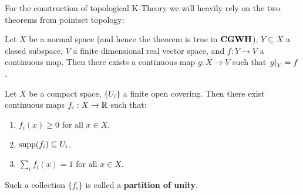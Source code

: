 For the construction of topological K-Theory we will heavily rely on the two theorems from pointset topology:
\begin{theorem} Let $X$ be a normal space (and hence the theorem is true in $\operatorname{\mathbf{CGWH}}$), $Y\subseteq X$ a closed subspace, $V$ a finite dimensional real vector space, and $f:Y\to V$ a continuous map. Then there exists a continuous map $g:X\to V$ such that $\left.g\right|_{Y}=f$.
\end{theorem}
\begin{theorem} Let $X$ be a compact space, $\{U_i\}$ a finite open covering. Then there exist continuous maps $f_i:X\to \mathbb{R}$ such that:
    \begin{enumerate}
        \item $f_i(x)\geq 0$ for all $x\in X$.
        \item $\operatorname{\mathrm{supp}}(f_i)\subseteq U_i$.
        \item $\sum_i f_i(x)=1$ for all $x\in X$.
    \end{enumerate}
Such a collection $\{f_i\}$ is called a \textbf{partition of unity}.
\end{theorem}
